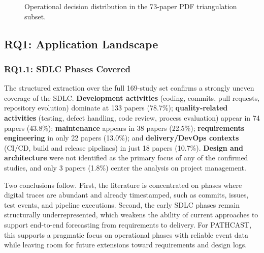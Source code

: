 \begin{figure}[tbp]
\centering
{}
\caption{Operational decision distribution in the 73-paper PDF triangulation subset.}
\label{fig:pdf-decision-dist}
\end{figure}

\subsection{RQ1: Application Landscape}
\label{sec:slr-rq1}

\subsubsection{RQ1.1: SDLC Phases Covered}

The structured extraction over the full 169-study set confirms a strongly
uneven coverage of the SDLC. \textbf{Development activities} (coding,
commits, pull requests, repository evolution) dominate at 133 papers
(78.7\%); \textbf{quality-related activities} (testing, defect handling, code
review, process evaluation) appear in 74 papers (43.8\%);
\textbf{maintenance} appears in 38 papers (22.5\%);
\textbf{requirements engineering} in only 22 papers (13.0\%); and
\textbf{delivery/DevOps contexts} (CI/CD, build and release pipelines) in
just 18 papers (10.7\%). \textbf{Design and architecture} were not
identified as the primary focus of any of the confirmed studies, and only 3
papers (1.8\%) center the analysis on project management.

Two conclusions follow. First, the literature is concentrated on phases where
digital traces are abundant and already timestamped, such as commits, issues,
test events, and pipeline executions. Second, the early SDLC phases remain
structurally underrepresented, which weakens the ability of current
approaches to support end-to-end forecasting from requirements to delivery.
For PATHCAST, this supports a pragmatic focus on operational phases with
reliable event data while leaving room for future extensions toward
requirements and design logs.

